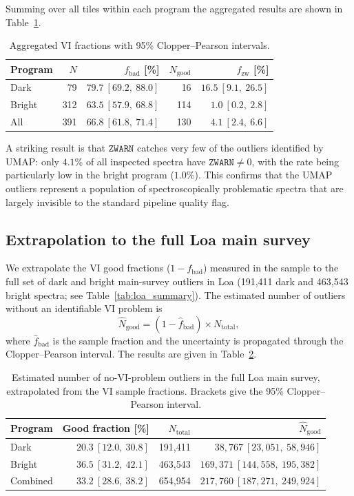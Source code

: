 Summing over all tiles within each program the aggregated results are
shown in Table~\ref{tab:vi_agg}.

\begin{table}[h]
\centering
\caption{Aggregated VI fractions with 95\% Clopper--Pearson intervals.}
\label{tab:vi_agg}
\begin{tabular}{lrrrr}
\hline
Program & $N$ & $f_\mathrm{bad}$ [\%] & $N_\mathrm{good}$ & $f_\mathrm{zw}$ [\%] \\
\hline
Dark   &  79 & $79.7\ [69.2,\ 88.0]$ & 16  & $16.5\ [9.1,\ 26.5]$ \\
Bright & 312 & $63.5\ [57.9,\ 68.8]$ & 114 & $1.0\ [0.2,\ 2.8]$   \\
\hline
All    & 391 & $66.8\ [61.8,\ 71.4]$ & 130 & $4.1\ [2.4,\ 6.6]$   \\
\hline
\end{tabular}
\end{table}

A striking result is that $\texttt{ZWARN}$ catches very few of the
outliers identified by UMAP: only $4.1\%$ of all inspected spectra
have $\texttt{ZWARN}\neq 0$, with the rate being particularly low
in the bright program ($1.0\%$).
This confirms that the UMAP outliers represent a population of
spectroscopically problematic spectra that are largely invisible to
the standard pipeline quality flag.

\subsection{Extrapolation to the full Loa main survey}

We extrapolate the VI good fractions ($1 - f_\mathrm{bad}$) measured
in the sample to the full set of dark and bright main-survey outliers
in Loa (191{,}411 dark and 463{,}543 bright spectra; see
Table~\ref{tab:loa_summary}).
The estimated number of outliers without an identifiable VI problem is
\begin{equation}
    \hat{N}_\mathrm{good} = (1 - \hat{f}_\mathrm{bad})\times N_\mathrm{total},
\end{equation}
where $\hat{f}_\mathrm{bad}$ is the sample fraction and the uncertainty
is propagated through the Clopper--Pearson interval.
The results are given in Table~\ref{tab:vi_extrap}.

\begin{table}[h]
\centering
\caption{Estimated number of no-VI-problem outliers in the full Loa main survey,
extrapolated from the VI sample fractions.
Brackets give the 95\% Clopper--Pearson interval.}
\label{tab:vi_extrap}
\begin{tabular}{lrrr}
\hline
Program & Good fraction [\%] & $N_\mathrm{total}$ & $\hat{N}_\mathrm{good}$ \\
\hline
Dark   & $20.3\ [12.0,\ 30.8]$ & 191{,}411 & $38{,}767\ [23{,}051,\ 58{,}946]$ \\
Bright & $36.5\ [31.2,\ 42.1]$ & 463{,}543 & $169{,}371\ [144{,}558,\ 195{,}382]$ \\
\hline
Combined & $33.2\ [28.6,\ 38.2]$ & 654{,}954 & $217{,}760\ [187{,}271,\ 249{,}924]$ \\
\hline
\end{tabular}
\end{table}

